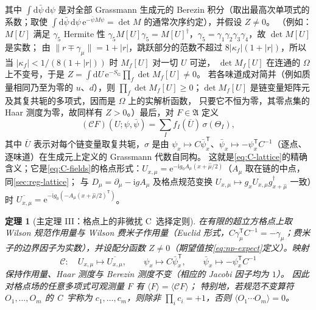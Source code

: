\documentclass[UTF8,a4paper,11pt,fontset=fandol]{ctexart}
\theoremstyle{cplain}
\newtheorem{theorem}{定理}[section]
\theoremstyle{cdefinition}
\theoremstyle{cremark}
\numberwithin{equation}{section}
\newcommand{\dd}{\mathrm{d}}                         %
\newcommand{\tp}{\mathsf{T}}                         %
\newcommand{\Cop}{\mathcal{C}}                       %
\newcommand{\ii}{\mathrm{i}}                        %
\newcommand{\ee}{\mathrm{e}}                        %
\begin{document}
其中 $\int\dd\bar\psi\,\dd\psi$ 是对全部 Grassmann 生成元的 Berezin 积分（取出最高次单项式的系数；取使 $\int\dd\bar\psi\,\dd\psi\,\ee^{-\bar\psi M\psi}=\det M$ 的通常次序约定），并假设 $Z\neq0$。
（例如：$M[U]$ 满足 $\gamma_5$ Hermite 性 $\gamma_5M[U]\gamma_5=M[U]^\dagger$，$\gamma_5=\gamma_1\gamma_2\gamma_3\gamma_4$，故 $\det M[U]$ 是实数；
由 $\|r\mp\gamma_\mu\|=1+|r|$，跳跃部分的范数不超过 $8|\kappa_f|(1+|r|)$，所以当 $|\kappa_f|<1/(8(1+|r|))$ 时 $M_f[U]$ 对一切 $U$ 可逆，
$\det M_f[U]$ 在连通的 $\Omega$ 上不变号，于是 $Z=\int\dd U\,\ee^{-S_{\mathrm G}}\prod_f\det M_f[U]\neq0$。
若各味道成对简并（例如质量相同乃至为零的 $u$、$d$），则 $\prod_f\det M_f[U]\ge0$；$\det M_f[U]$ 是链变量矩阵元及其复共轭的多项式，因而是 $\Omega$ 上的实解析函数，
只要它不恒为零，其零点集的 Haar 测度为零，故同样有 $Z>0$。）最后，对 $F\in\mathfrak A$ 定义
\begin{equation}\label{eq:np-CF}
(\Cop F)(U;\psi,\bar\psi)=\sum_If_I(\overline U)\,\sigma(\Theta_I),
\end{equation}
其中 $\overline U$ 表示对每个链变量取复共轭，$\sigma$ 是由 $\psi_x\mapsto C\bar\psi_x^{\tp}$、$\bar\psi_x\mapsto-\psi_x^{\tp}C^{-1}$（逐点、逐味道）在生成元上定义的 Grassmann 代数自同构。
这就是\cref{eq:C-lattice}的精确含义；它是\cref{eq:C-fields}的格点形式：$U_{x,\mu}=\ee^{-\ii g_0A_\mu(x+\hat\mu/2)}$（$A_\mu$ 取在链的中点，同\cref{sec:reg-lattice}；
与 $D_\mu=\partial_\mu-\ii gA_\mu$ 及格点规范变换 $U_{x,\mu}\mapsto g_xU_{x,\mu}g^\dagger_{x+\hat\mu}$ 一致）时
$\overline{U_{x,\mu}}=\ee^{-\ii g_0(-A_\mu(x+\hat\mu/2)^{\tp})}$。

\begin{theorem}[主定理 III：格点上的非微扰 C~选择定则]\label{thm:lattice}
在有限的超立方格点上取 Wilson 规范作用量与 Wilson 费米子作用量（Euclid 形式，$C\gamma_\mu^{\tp}C^{-1}=-\gamma_\mu$；费米子的边界因子为实数），并设配分函数 $Z\neq0$（期望值按\cref{eq:np-expect}定义）。映射
\begin{equation}\label{eq:C-lattice}
\Cop:\quad U_{x,\mu}\mapsto\overline{U_{x,\mu}},\qquad \psi_x\mapsto C\bar\psi_x^{\tp},\qquad \bar\psi_x\mapsto-\psi_x^{\tp}C^{-1}
\end{equation}
保持作用量、Haar 测度与 Berezin 测度不变（相应的 Jacobi 因子均为 $1$）。
因此对格点场的任意多项式可观测量 $F$ 有 $\langle F\rangle=\langle\Cop F\rangle$；
特别地，若规范不变算符 $O_1,\dots,O_m$ 的 C~宇称为 $c_1,\dots,c_m$，则除非 $\prod_ic_i=+1$，否则 $\langle O_1\cdots O_m\rangle=0$。
\end{theorem}
\end{document}
